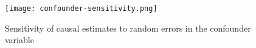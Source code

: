 \begin{figure}
   \centering
   \texttt{[image: confounder-sensitivity.png]}
   \caption{Sensitivity of causal estimates to random errors in the confounder variable}
   \label{fig:confounder-sensitivity}
\end{figure}

